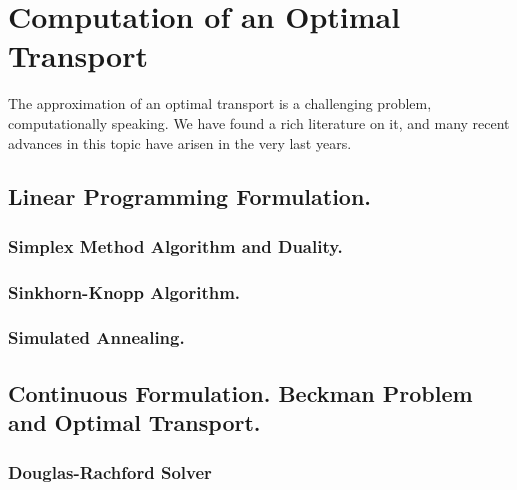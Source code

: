 \chapter{Computation of an Optimal Transport}
The approximation of an optimal transport is a challenging problem, computationally speaking. We have found a rich literature on it, and many recent advances in this topic have arisen in the very last years. 
\section{Linear Programming Formulation.}
\subsection{Simplex Method Algorithm and Duality.}
\subsection{Sinkhorn-Knopp Algorithm.}
\subsection{Simulated Annealing.}

 \section{Continuous Formulation. Beckman Problem and Optimal Transport.}

\subsection{Douglas-Rachford Solver}

